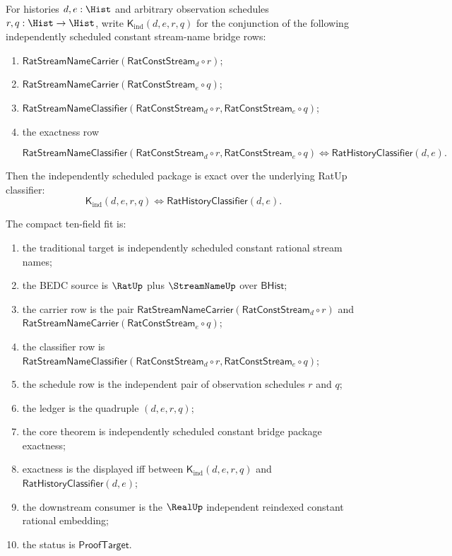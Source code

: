\begin{theorem}
\label{thm:rat-stream-name-independent-constant-bridge-package-exactness}
For histories $d,e:\Hist$ and arbitrary observation schedules
$r,q:\Hist\to\Hist$, write $\mathsf{K}_{\mathrm{ind}}(d,e,r,q)$ for the
conjunction of the following independently scheduled constant stream-name
bridge rows:
\begin{enumerate}
  \item $\mathsf{RatStreamNameCarrier}(\mathsf{RatConstStream}_d\circ r)$;
  \item $\mathsf{RatStreamNameCarrier}(\mathsf{RatConstStream}_e\circ q)$;
  \item $\mathsf{RatStreamNameClassifier}(\mathsf{RatConstStream}_d\circ r,
  \mathsf{RatConstStream}_e\circ q)$;
  \item the exactness row

  $$
  \mathsf{RatStreamNameClassifier}(\mathsf{RatConstStream}_d\circ r,
  \mathsf{RatConstStream}_e\circ q)
  \Longleftrightarrow
  \mathsf{RatHistoryClassifier}(d,e).
  $$

\end{enumerate}
Then the independently scheduled package is exact over the underlying RatUp
classifier:
$$
\mathsf{K}_{\mathrm{ind}}(d,e,r,q)
\Longleftrightarrow
\mathsf{RatHistoryClassifier}(d,e).
$$

The compact ten-field fit is:
\begin{enumerate}
  \item the traditional target is independently scheduled constant rational
  stream names;
  \item the BEDC source is $\RatUp$ plus $\StreamNameUp$ over
  $\mathsf{BHist}$;
  \item the carrier row is the pair
  $\mathsf{RatStreamNameCarrier}(\mathsf{RatConstStream}_d\circ r)$ and
  $\mathsf{RatStreamNameCarrier}(\mathsf{RatConstStream}_e\circ q)$;
  \item the classifier row is
  $\mathsf{RatStreamNameClassifier}(\mathsf{RatConstStream}_d\circ r,
  \mathsf{RatConstStream}_e\circ q)$;
  \item the schedule row is the independent pair of observation schedules
  $r$ and $q$;
  \item the ledger is the quadruple $(d,e,r,q)$;
  \item the core theorem is independently scheduled constant bridge package
  exactness;
  \item exactness is the displayed iff between
  $\mathsf{K}_{\mathrm{ind}}(d,e,r,q)$ and
  $\mathsf{RatHistoryClassifier}(d,e)$;
  \item the downstream consumer is the $\RealUp$ independent reindexed
  constant rational embedding;
  \item the status is $\mathsf{ProofTarget}$.
\end{enumerate}
\end{theorem}

